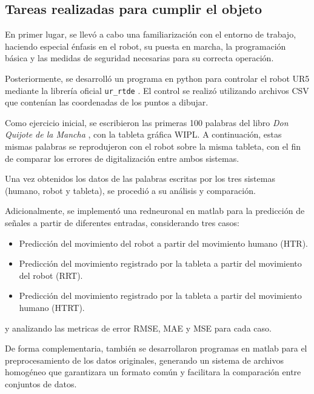 \documentclass[12pt,a4paper,oneside]{report}
\begin{document}
\subsection{Tareas realizadas para cumplir el objeto}

En primer lugar, se llevó a cabo una familiarización con el entorno de trabajo, 
haciendo especial énfasis en el \gls{robot}, su puesta en marcha, la programación básica 
y las medidas de seguridad necesarias para su correcta operación.  

Posteriormente, se desarrolló un programa en \gls{python} para controlar el \gls{robot} \acrfull{UR5} 
mediante la librería oficial \texttt{ur\_rtde} \cite{ur_rtde}. 
El control se realizó utilizando archivos \acrshort{CSV} que contenían las coordenadas de los puntos a dibujar.  

Como ejercicio inicial, se escribieron las primeras 100 palabras del libro \textit{Don Quijote de la Mancha} \cite{cervantes1605},
con la tableta gráfica \acrfull{WIPL}. A continuación, estas mismas palabras se reprodujeron con el \gls{robot} 
sobre la misma tableta, con el fin de comparar los errores de digitalización entre ambos sistemas.  

Una vez obtenidos los datos de las palabras escritas por los tres sistemas (humano, robot y tableta), 
se procedió a su análisis y comparación.  

Adicionalmente, se implementó una \gls{redneuronal} en \gls{matlab} 
para la predicción de señales a partir de diferentes entradas, considerando tres casos:

\begin{itemize}
  \item Predicción del movimiento del robot a partir del movimiento humano (\acrshort{HTR}).
  \item Predicción del movimiento registrado por la tableta a partir del movimiento del robot (\acrshort{RRT}).
  \item Predicción del movimiento registrado por la tableta a partir del movimiento humano (\acrshort{HTRT}).
\end{itemize}

y analizando las metricas de error \acrfull{RMSE}, \acrfull{MAE} y \acrfull{MSE}
para cada caso.

De forma complementaria, también se desarrollaron programas en \gls{matlab} 
para el preprocesamiento de los datos originales, generando un sistema de archivos homogéneo 
que garantizara un formato común y facilitara la comparación entre conjuntos de datos.  
\end{document}
